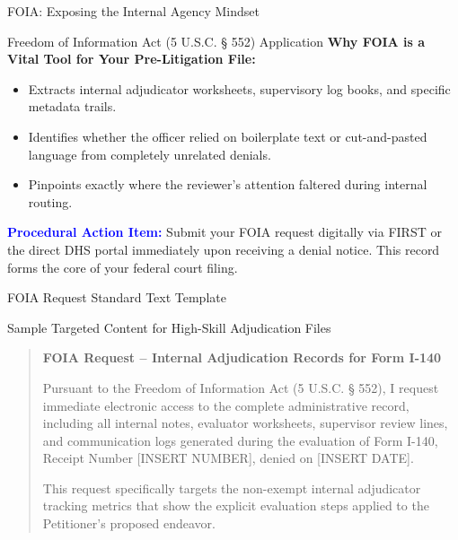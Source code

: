 \documentclass[11pt]{beamer}
\begin{document}
	\begin{frame}{FOIA: Exposing the Internal Agency Mindset}
		\scriptsize
		\begin{block}{Freedom of Information Act (5 U.S.C. § 552) Application}
			\textbf{Why FOIA is a Vital Tool for Your Pre-Litigation File:}
			\begin{itemize}
				\item Extracts internal adjudicator worksheets, supervisory log books, and specific metadata trails.
				\item Identifies whether the officer relied on boilerplate text or cut-and-pasted language from completely unrelated denials.
				\item Pinpoints exactly where the reviewer's attention faltered during internal routing.
			\end{itemize}
			\textcolor{blue}{\textbf{Procedural Action Item:}} Submit your FOIA request digitally via FIRST or the direct DHS portal immediately upon receiving a denial notice. This record forms the core of your federal court filing.
		\end{block}
	\end{frame}
	
	\begin{frame}{FOIA Request Standard Text Template}
		\scriptsize
		\begin{block}{Sample Targeted Content for High-Skill Adjudication Files}
			\begin{quote}
				\scriptsize
				\textbf{FOIA Request -- Internal Adjudication Records for Form I-140}
				
				Pursuant to the Freedom of Information Act (5 U.S.C. § 552), I request immediate electronic access to the complete administrative record, including all internal notes, evaluator worksheets, supervisor review lines, and communication logs generated during the evaluation of Form I-140, Receipt Number [INSERT NUMBER], denied on [INSERT DATE]. 
				
				This request specifically targets the non-exempt internal adjudicator tracking metrics that show the explicit evaluation steps applied to the Petitioner’s proposed endeavor.
			\end{quote}
		\end{block}
	\end{frame}
	
\end{document}
